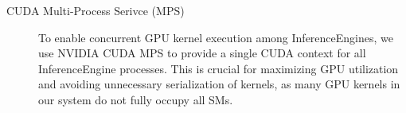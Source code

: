 \begin{description}
    \item[CUDA Multi-Process Serivce (MPS) \cite{CUDA_MPS}] To enable concurrent GPU kernel execution among InferenceEngines, we use NVIDIA CUDA MPS to provide a single CUDA context for all InferenceEngine processes. This is crucial for maximizing GPU utilization and avoiding unnecessary serialization of kernels, as many GPU kernels in our system do not fully occupy all SMs.
\end{description}

